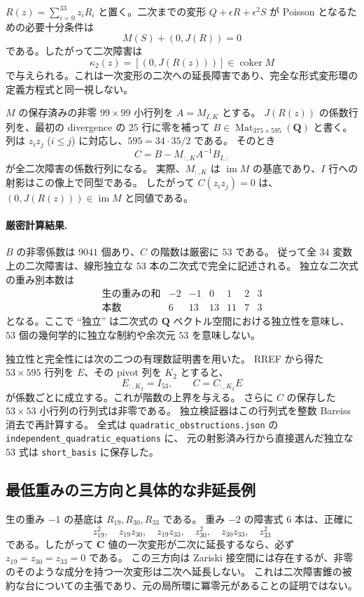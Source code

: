 $R(z)=\sum_{i=0}^{33}z_iR_i$ と置く。二次までの変形
$Q+\epsilon R+\epsilon^2S$ が Poisson となるための必要十分条件は
\[
 M(S)+(0,J(R))=0
\]
である。したがって二次障害は
\[
 \kappa_2(z)=[(0,J(R(z)))]\in\operatorname{coker}M
\]
で与えられる。これは一次変形の二次への延長障害であり、完全な形式変形環の定義方程式と同一視しない。

$M$ の保存済みの非零 $99\times99$ 小行列を $A=M_{I,K}$ とする。
$J(R(z))$ の係数行列を、最初の divergence の $25$ 行に零を補って
$B\in\operatorname{Mat}_{375\times595}(\mathbf Q)$ と書く。
列は $z_iz_j$ ($i\leq j$) に対応し、$595=34\cdot35/2$ である。
そのとき
\[
 C=B-M_{:,K}A^{-1}B_{I,:}
\]
が全二次障害の係数行列になる。
実際、$M_{:,K}$ は $\operatorname{im}M$ の基底であり、$I$ 行への射影はこの像上で同型である。
したがって $C(z_iz_j)=0$ は、$(0,J(R(z)))\in\operatorname{im}M$ と同値である。

\paragraph{厳密計算結果.}
$B$ の非零係数は $9041$ 個あり、$C$ の階数は厳密に $53$ である。
従って全 $34$ 変数上の二次障害は、線形独立な $53$ 本の二次式で完全に記述される。
独立な二次式の重み別本数は
\[
\begin{array}{c|rrrrrr}
\text{生の重みの和}&-2&-1&0&1&2&3\\\hline
\text{本数}&6&13&13&11&7&3
\end{array}
\]
となる。ここで ``独立'' は二次式の $\mathbf Q$ ベクトル空間における独立性を意味し、
$53$ 個の幾何学的に独立な制約や余次元 $53$ を意味しない。

独立性と完全性には次の二つの有理数証明書を用いた。
RREF から得た $53\times595$ 行列を $E$、その pivot 列を $K_2$ とすると、
\[
 E_{:,K_2}=I_{53},\qquad C=C_{:,K_2}E
\]
が係数ごとに成立する。これが階数の上界を与える。
さらに $C$ の保存した $53\times53$ 小行列の行列式は非零である。
独立検証器はこの行列式を整数 Bareiss 消去で再計算する。
全式は \texttt{quadratic\_obstructions.json} の
\texttt{independent\_quadratic\_equations} に、
元の射影済み行から直接選んだ独立な $53$ 式は \texttt{short\_basis} に保存した。

\subsection{最低重みの三方向と具体的な非延長例}

生の重み $-1$ の基底は $R_{19},R_{30},R_{33}$ である。
重み $-2$ の障害式 $6$ 本は、正確に
\[
 z_{19}^2,\quad z_{19}z_{30},\quad z_{19}z_{33},\quad
 z_{30}^2,\quad z_{30}z_{33},\quad z_{33}^2
\]
である。したがって $\mathbf C$ 値の一次変形が二次に延長するなら、必ず
$z_{19}=z_{30}=z_{33}=0$ である。
この三方向は Zariski 接空間には存在するが、非零のそのような成分を持つ一次変形は二次へ延長しない。
これは二次障害錐の被約な台についての主張であり、元の局所環に冪零元があることの証明ではない。

